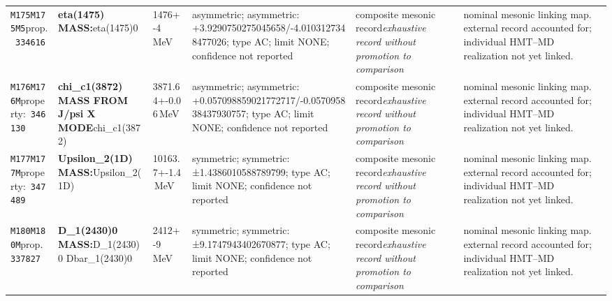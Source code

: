 \begin{landscape}
\begin{longtable}{L{1.85cm}L{4.45cm}L{2.35cm}L{4.05cm}L{3.35cm}L{7.15cm}}
\texttt{M175}\newline \texttt{M175M5}\newline prop.\ \texttt{334616} & \textbf{eta(1475) MASS:}\newline eta(1475)0 & 1476+-4\,MeV & asymmetric; asymmetric: +3.9290750275045658/-4.0103127348477026; type AC; limit NONE; confidence not reported & composite mesonic record\newline \emph{exhaustive record without promotion to comparison} & nominal mesonic linking map. external record accounted for; individual HMT--MD realization not yet linked. \\
\texttt{M176}\newline \texttt{M176M}\newline property:\ \texttt{346130} & \textbf{chi\_\allowbreak{}c1(3872) MASS FROM J/psi X MODE}\newline chi\_\allowbreak{}c1(3872) & 3871.64+-0.06\,MeV & asymmetric; asymmetric: +0.057098859021772717/-0.057095838437930757; type AC; limit NONE; confidence not reported & composite mesonic record\newline \emph{exhaustive record without promotion to comparison} & nominal mesonic linking map. external record accounted for; individual HMT--MD realization not yet linked. \\
\texttt{M177}\newline \texttt{M177M}\newline property:\ \texttt{347489} & \textbf{Upsilon\_\allowbreak{}2(1D) MASS:}\newline Upsilon\_\allowbreak{}2(1D) & 10163.7+-1.4\,MeV & symmetric; symmetric: ±1.4386010588789799; type AC; limit NONE; confidence not reported & composite mesonic record\newline \emph{exhaustive record without promotion to comparison} & nominal mesonic linking map. external record accounted for; individual HMT--MD realization not yet linked. \\
\texttt{M180}\newline \texttt{M180M}\newline prop.\ \texttt{337827} & \textbf{D\_\allowbreak{}1(2430)0 MASS:}\newline D\_\allowbreak{}1(2430)0 \textbar{}\allowbreak{} Dbar\_\allowbreak{}1(2430)0 & 2412+-9\,MeV & symmetric; symmetric: ±9.1747943402670877; type AC; limit NONE; confidence not reported & composite mesonic record\newline \emph{exhaustive record without promotion to comparison} & nominal mesonic linking map. external record accounted for; individual HMT--MD realization not yet linked. \\

\end{longtable}
\end{landscape}

